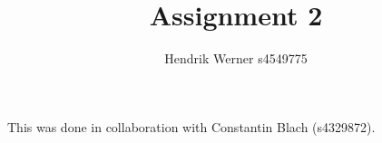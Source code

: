 \documentclass[12pt]{article}
\title {Assignment 2}
\author {Hendrik Werner s4549775}
\begin{document}
\maketitle

This was done in collaboration with Constantin Blach (s4329872).

\section{} %


\section{} %
\section{} %
\section{} %
\section{} %
\section{} %
\end{document}
